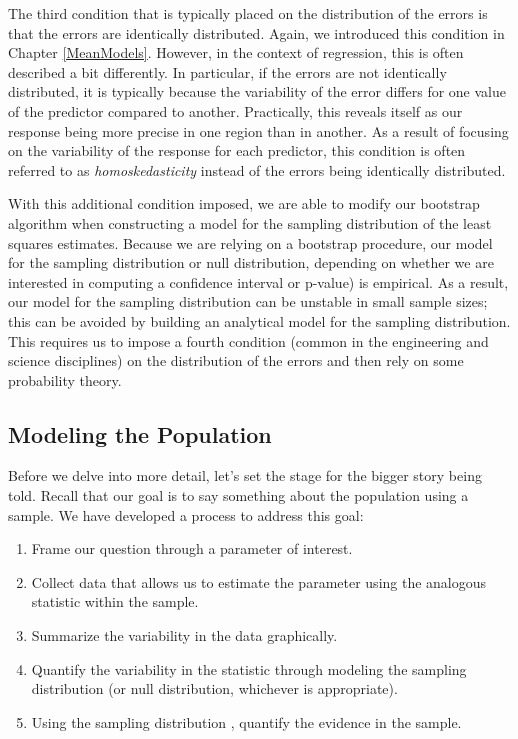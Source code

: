 \documentclass[
]{book}
\providecommand{\tightlist}{%
  \setlength{\itemsep}{0pt}\setlength{\parskip}{0pt}}
\theoremstyle{plain}
\theoremstyle{mydefn}
\theoremstyle{myexmpl}
\theoremstyle{remark}
\begin{document}
The third condition that is typically placed on the distribution of the errors is that the errors are identically distributed. Again, we introduced this condition in Chapter \ref{MeanModels}. However, in the context of regression, this is often described a bit differently. In particular, if the errors are not identically distributed, it is typically because the variability of the error differs for one value of the predictor compared to another. Practically, this reveals itself as our response being more precise in one region than in another. As a result of focusing on the variability of the response for each predictor, this condition is often referred to as \emph{homoskedasticity} instead of the errors being identically distributed.

With this additional condition imposed, we are able to modify our bootstrap algorithm when constructing a model for the sampling distribution of the least squares estimates. Because we are relying on a bootstrap procedure, our model for the sampling distribution or null distribution, depending on whether we are interested in computing a confidence interval or p-value) is empirical. As a result, our model for the sampling distribution can be unstable in small sample sizes; this can be avoided by building an analytical model for the sampling distribution. This requires us to impose a fourth condition (common in the engineering and science disciplines) on the distribution of the errors and then rely on some probability theory.

\hypertarget{modeling-the-population}{%
\subsection{Modeling the Population}\label{modeling-the-population}}

Before we delve into more detail, let's set the stage for the bigger story being told. Recall that our goal is to say something about the population using a sample. We have developed a process to address this goal:

\begin{enumerate}
\def\labelenumi{\arabic{enumi}.}
\tightlist
\item
  Frame our question through a parameter of interest.
\item
  Collect data that allows us to estimate the parameter using the analogous statistic within the sample.
\item
  Summarize the variability in the data graphically.
\item
  Quantify the variability in the statistic through modeling the sampling distribution (or null distribution, whichever is appropriate).
\item
  Using the sampling distribution , quantify the evidence in the sample.
\end{enumerate}
\end{document}
